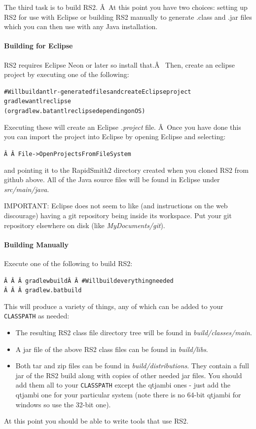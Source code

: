 \documentclass[12pt]{article}
\newcommand{\env}[1]{{\texttt{#1}}}
\newcommand{\fil}[1]{{\em #1}}
\newcommand{\dir}[1]{{\em #1}}
\newenvironment{code}{\begin{center} \begin{minipage}{6in} \noindent \begin{alltt}}{\end{alltt} \end{minipage} \end{center}}
\begin{document}
The third task is to build RS2. Â At this point you have two choices: setting up
RS2 for use with Eclipse or building RS2 manually to generate
.class and .jar files which you can then use with any Java installation.
	
\paragraph{Building for Eclipse}  
RS2 requires Eclipse Neon or later so install that.Â 
Then, create an eclipse project by executing one of the following:

\vspace{-0.15in}  \begin{code}
# Will build antlr-generated files and create Eclipse project
gradlew antlr eclipse       
(or gradlew.bat antlr eclipse depending on OS)
\end{code} 
Executing these will create an Eclipse \fil{.project} file. Â Once you have done
this you can import the project into Eclipse by opening Eclipse and selecting: 
\vspace{-0.15in}  \begin{code}
Â  Â  File->Open Projects From File System 
\end{code}
and pointing it to the RapidSmith2 directory created when you cloned RS2 from
github above. 
All of the Java source files will be found in Eclipse under \dir{src/main/java}.

IMPORTANT: Eclipse does not seem to like (and instructions on the web
discourage) having a git repository being inside its workspace.  Put your git
repository elsewhere on disk (like \dir{MyDocuments/git}).

\paragraph{Building Manually} 
Execute one of the following to build RS2: 
\vspace{-0.15in}  \begin{code}
Â  Â  Â gradlew build Â  Â  # Will build everything needed
Â  Â  Â gradlew.bat build 
\end{code}
This will produce a variety of things, any of which can be added to your
\env{CLASSPATH} as needed:
\begin{itemize}
  \item The resulting RS2 class file directory tree will be found in
  \dir{build/classes/main}.
  \item	A jar file of the above RS2 class files can be
  found in \dir{build/libs}.
  \item Both tar and zip files can be found in \dir{build/distributions}. They
  contain a full jar of the RS2 build along with copies of other needed jar
  files. You should add them all to your \env{CLASSPATH} except the qtjambi ones
  - just add the qtjambi one for your particular system (note there is no 64-bit
  qtjambi for windows so use the 32-bit one).
\end{itemize}
At this point you should be able to write tools that use RS2.
\end{document}
